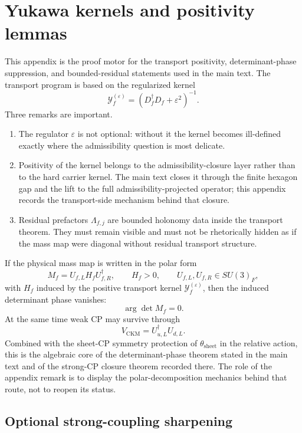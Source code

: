 \section{Yukawa kernels and positivity lemmas}
\label{app:yukawa}

This appendix is the proof motor for the transport positivity, determinant-phase suppression, and
bounded-residual statements used in the main text. The transport program is based on the regularized kernel
\[
\mathcal Y_f^{(\varepsilon)}=(D_f^\dagger D_f+\varepsilon^2)^{-1}.
\]
Three remarks are important.
\begin{enumerate}[leftmargin=1.5em, topsep=3pt, itemsep=3pt]
    \item The regulator $\varepsilon$ is not optional: without it the kernel becomes ill-defined exactly where the admissibility question is most delicate.
    \item Positivity of the kernel belongs to the admissibility-closure layer rather than to the hard carrier kernel. The main text closes it through the finite hexagon gap and the lift to the full admissibility-projected operator; this appendix records the transport-side mechanism behind that closure.
    \item Residual prefactors $\Lambda_{f,j}$ are bounded holonomy data inside the transport theorem. They must remain visible and must not be rhetorically hidden as if the mass map were diagonal without residual transport structure.
\end{enumerate}

\begin{remark}
If the physical mass map is written in the polar form
\[
M_f=U_{f,L}H_fU_{f,R}^\dagger,
\qquad
H_f>0,
\qquad
U_{f,L},U_{f,R}\in SU(3)_F,
\]
with $H_f$ induced by the positive transport kernel $\mathcal Y_f^{(\varepsilon)}$, then the induced determinant phase vanishes:
\[
\arg\det M_f=0.
\]
At the same time weak CP may survive through
\[
V_{\mathrm{CKM}}=U_{u,L}^\dagger U_{d,L}.
\]
Combined with the sheet-CP symmetry protection of $\theta_{\mathrm{sheet}}$ in the relative action,
this is the algebraic core of the determinant-phase theorem stated in the main text and of the
strong-CP closure theorem recorded there. The role of the appendix remark is to display the
polar-decomposition mechanics behind that route, not to reopen its status.
\end{remark}

\subsection{Optional strong-coupling sharpening}

